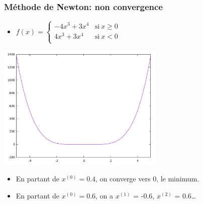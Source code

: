\documentclass{beamer}
\begin{document}
\begin{frame}
  \frametitle{Méthode de Newton: non convergence}

  \begin{itemize}
  \item $f(x) = \left \{
    \begin{array}{ll}
      -4x^3 + 3x^4 & \text{si} \ x\geq 0 \\
      4x^3 + 3x^4 & \text{si} \ x < 0 \\
    \end{array} \right.$
  \end{itemize}
  
  \begin{center}
      \includegraphics[width=0.6\textwidth]{newton-non-conv}    
  \end{center}
  
  \begin{itemize}
  \item En partant de $x^{(0)} = 0.4$, on converge vers 0, le minimum.
  \item En partant de $x^{(0)} = 0.6$, on a $x^{(1)}$ = -0.6, $x^{(2)}$ = 0.6\dots 
  \end{itemize}
  
\end{frame}
\end{document}
